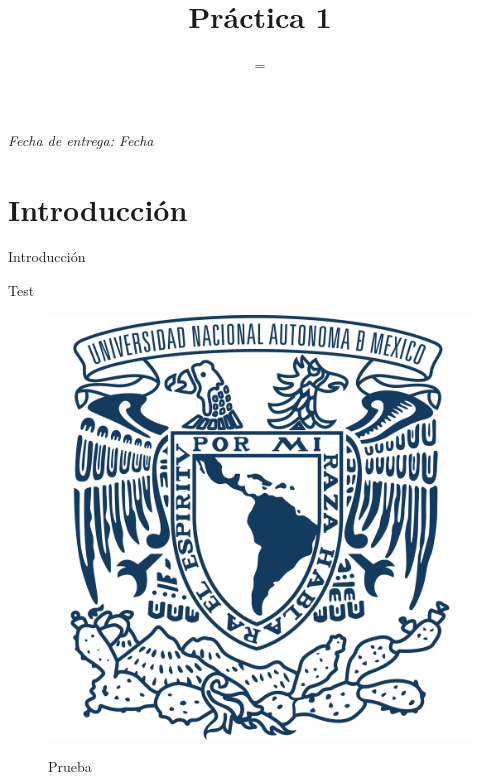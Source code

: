 \documentclass{replab}
\title{Práctica 1}
\subtitle={Nombre de Práctica}
\begin{document}
	
	\pagestyle{fancy}
	\unspacedoperators
	
\onecolumn
        \begin{center}
			\maketitle
		\end{center}

        \vspace*{\fill}
        \begin{center}
            \textit{Fecha de entrega: Fecha}
        \end{center}


\twocolumn

\renewcommand{\abstractname}{Objetivos}
	

\setcounter{page}{1}

\twocolumn[
	\begin{center}
		\begin{onecolabstract}
			Objetivos
		\end{onecolabstract}
	\end{center}
]

\bigskip
	
	\section{Introducción}

Introducción

Test

\begin{figure}[hbt!]
    \includegraphics[width=0.9\columnwidth]{escudos/unam.png}
    \label{fig:figura1}
    \caption{Prueba}
\end{figure}
\end{document}
